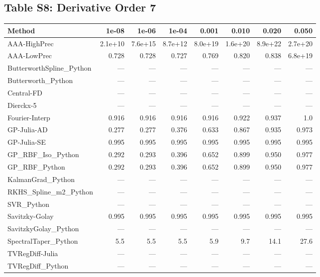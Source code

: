 \clearpage

\subsection*{Table S8: Derivative Order 7}

\begin{longtable}{lrrrrrrr}
\toprule
\textbf{Method} & \textbf{1e-08} & \textbf{1e-06} & \textbf{1e-04} & \textbf{0.001} & \textbf{0.010} & \textbf{0.020} & \textbf{0.050} \\
\midrule
\endhead
AAA-HighPrec & 2.1e+10 & 7.6e+15 & 8.7e+12 & 8.0e+19 & 1.6e+20 & 8.9e+22 & 2.7e+20 \\
AAA-LowPrec & 0.728 & 0.728 & 0.727 & 0.769 & 0.820 & 0.838 & 6.8e+19 \\
ButterworthSpline\_Python & --- & --- & --- & --- & --- & --- & --- \\
Butterworth\_Python & --- & --- & --- & --- & --- & --- & --- \\
Central-FD & --- & --- & --- & --- & --- & --- & --- \\
Dierckx-5 & --- & --- & --- & --- & --- & --- & --- \\
Fourier-Interp & 0.916 & 0.916 & 0.916 & 0.916 & 0.922 & 0.937 & 1.0 \\
GP-Julia-AD & 0.277 & 0.277 & 0.376 & 0.633 & 0.867 & 0.935 & 0.973 \\
GP-Julia-SE & 0.995 & 0.995 & 0.995 & 0.995 & 0.995 & 0.995 & 0.995 \\
GP\_RBF\_Iso\_Python & 0.292 & 0.293 & 0.396 & 0.652 & 0.899 & 0.950 & 0.977 \\
GP\_RBF\_Python & 0.292 & 0.293 & 0.396 & 0.652 & 0.899 & 0.950 & 0.977 \\
KalmanGrad\_Python & --- & --- & --- & --- & --- & --- & --- \\
RKHS\_Spline\_m2\_Python & --- & --- & --- & --- & --- & --- & --- \\
SVR\_Python & --- & --- & --- & --- & --- & --- & --- \\
Savitzky-Golay & 0.995 & 0.995 & 0.995 & 0.995 & 0.995 & 0.995 & 0.995 \\
SavitzkyGolay\_Python & --- & --- & --- & --- & --- & --- & --- \\
SpectralTaper\_Python & 5.5 & 5.5 & 5.5 & 5.9 & 9.7 & 14.1 & 27.6 \\
TVRegDiff-Julia & --- & --- & --- & --- & --- & --- & --- \\
TVRegDiff\_Python & --- & --- & --- & --- & --- & --- & --- \\

\end{longtable}
